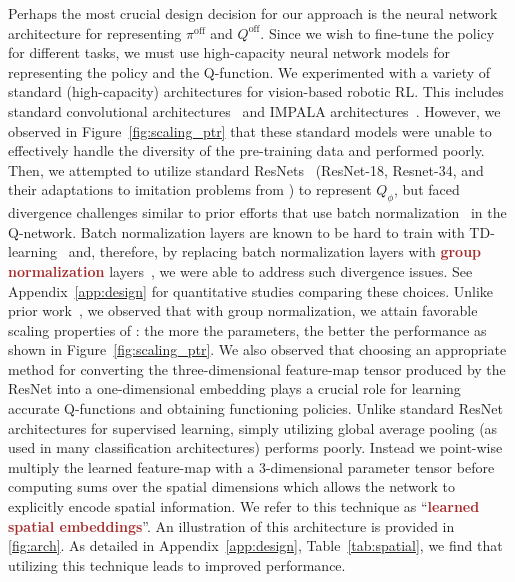 Perhaps the most crucial design decision for our approach is the neural network architecture for representing $\pi^\text{off}$ and $Q^\text{off}$. Since we wish to fine-tune the policy for different tasks, we must use high-capacity neural network models for representing the policy and the Q-function. We experimented with a variety of standard (high-capacity) architectures for vision-based robotic RL. This includes standard convolutional architectures~\citep{singh2020cog} and IMPALA architectures~\citep{espeholt2018impala}. However, we observed in Figure~\ref{fig:scaling_ptr} that these {standard models were unable to effectively handle the diversity of the pre-training data} and performed poorly.
Then, we attempted to utilize standard ResNets~\citep{resnet} (ResNet-18, Resnet-34, and their adaptations to imitation problems from \citet{ebert2021bridge}) to represent $Q_\phi$, but faced divergence challenges similar to prior efforts that use batch normalization~\citep{bjorck2021towards,2019arXiv190205605B} in the Q-network. Batch normalization layers are known to be hard to train with TD-learning~\citep{2019arXiv190205605B} and, therefore, by replacing batch normalization layers with \textcolor{brown}{\textbf{group normalization}} layers~\citep{wu2018group}, we were able to address such divergence issues.
See Appendix~\ref{app:design} for quantitative studies comparing these choices. Unlike prior work~\citep{lee2022multi}, we observed that with group normalization, we attain favorable scaling properties of \ptrmethodname: the more the parameters, the better the performance as shown in Figure~\ref{fig:scaling_ptr}.
We also observed that choosing an appropriate method for converting the three-dimensional feature-map tensor produced by the ResNet into a one-dimensional embedding plays a crucial role for learning accurate Q-functions and obtaining functioning policies. Unlike standard ResNet architectures for supervised learning, simply utilizing global average pooling (as used in many classification architectures) performs poorly. Instead we point-wise multiply the learned feature-map with a 3-dimensional parameter tensor before computing sums over the spatial dimensions which allows the network to explicitly encode spatial information. {We refer to this technique as ``\textcolor{brown}{\textbf{learned spatial embeddings}}''}. An illustration of this architecture is provided in \autoref{fig:arch}. As detailed in Appendix~\ref{app:design}, Table~\ref{tab:spatial}, {we find that utilizing this technique leads to improved performance}.

